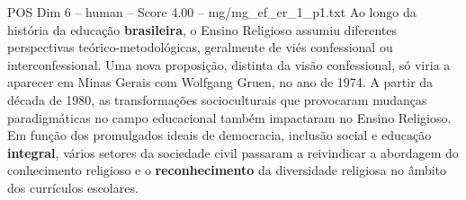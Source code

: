 \begin{textsample}{POS Dim 6 – human – Score 4.00 – mg/mg\_ef\_er\_1\_p1.txt}  \label{ex:f6_pos_004}
Ao longo da história da educação \textbf{brasileira}, o Ensino Religioso assumiu diferentes perspectivas teórico-metodológicas, geralmente de viés confessional ou interconfessional.
Uma nova proposição, distinta da visão confessional, só viria a aparecer em Minas Gerais com Wolfgang Gruen, no ano de 1974.
A partir da década de 1980, as transformações socioculturais que provocaram mudanças paradigmáticas no campo educacional também impactaram no Ensino Religioso.
Em função dos promulgados ideais de democracia, inclusão social e educação \textbf{integral}, vários setores da sociedade civil passaram a reivindicar a abordagem do conhecimento religioso e o \textbf{reconhecimento} da diversidade religiosa no âmbito dos currículos escolares.

\end{textsample}
